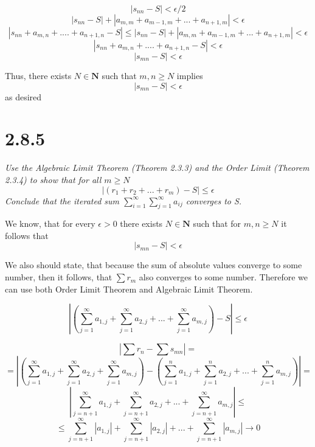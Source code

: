 \documentclass[11pt,oneside,titlepage]{book}
\begin{document}
$$|s_{nn} - S| < \epsilon/2$$
$$|s_{nn} - S| + |a_{m,m} + a_{m - 1, m} + ... + a_{n + 1,m}| < \epsilon$$
$$|s_{nn} + a_{m, n} + .... + a_{n + 1, n} - S| \leq |s_{nn} - S| + |a_{m,m} + a_{m - 1, m} + ... + a_{n + 1,m}| <  \epsilon$$
$$|s_{nn} + a_{m, n} + .... + a_{n + 1, n} - S| < \epsilon$$
$$|s_{mn}  - S| < \epsilon$$

Thus, there exists $N \in \textbf{N}$ such that $m, n \geq N$ implies
$$|s_{mn} - S| < \epsilon$$
as desired

\section*{2.8.5}
\textit{Use the Algebraic Limit Theorem (Theorem 2.3.3) and the Order Limit
  (Theorem 2.3.4) to show that for all $m \geq N$}
$$|(r_1 + r_2 + ... + r_m) - S| \leq  \epsilon$$
\textit{Conclude that the iterated sum
  $\sum_{i=1}^{\infty}\sum_{j=1}^{\infty} a_{ij}$ converges to S.}

We know, that for every $\epsilon > 0$  there exists $N \in \textbf{N}$ such
that for $m,n \geq N$ it follows that
$$|s_{mn} - S| < \epsilon$$

We also should state, that because the sum of absolute values converge
to some number, then it follows, that $\sum r_m$ also converges to some number.
Therefore we can use both Order Limit Theorem and Algebraic Limit Theorem.

$$\left|\left(\sum_{j = 1}^{\infty}a_{1,j} + \sum_{j = 1}^{\infty}a_{2,j} + ... + \sum_{j = 1}^{\infty}a_{m,j}\right) - S\right| \leq  \epsilon$$



$$\left|\sum r_n - \sum s_{mn}\right| = $$
$$ = \left|(\sum_{j=1}^{\infty} a_{1,j} + \sum_{j=1}^{\infty} a_{2,j} + \sum_{j=1}^{\infty} a_{m,j})
  - (\sum_{j=1}^{n} a_{1,j} + \sum_{j=1}^{n} a_{2,j} + ... + \sum_{j=1}^{n} a_{m,j})\right| = $$
$$\left|\sum_{j = n + 1}^{\infty} a_{1,j} + \sum_{j = n + 1}^{\infty} a_{2,j} + ...
  + \sum_{j = n + 1}^{\infty} a_{m,j} \right| \leq $$
$$
\leq \sum_{j = n + 1}^{\infty} |a_{1,j}| + \sum_{j = n + 1}^{\infty} |a_{2,j}| + ...
+ \sum_{j = n + 1}^{\infty} |a_{m,j}|  \to 0
$$
\end{document}
